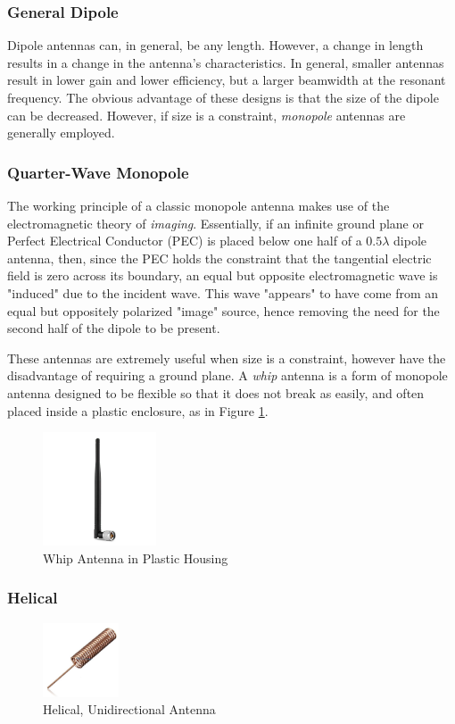 \subsubsection{General Dipole}
Dipole antennas can, in general, be any length. However, a change in length results in a change in the antenna's characteristics. In general, smaller antennas result in lower gain and lower efficiency, but a larger beamwidth at the resonant frequency. The obvious advantage of these designs is that the size of the dipole can be decreased. However, if size is a constraint, \textit{monopole} antennas are generally employed.

\subsubsection{Quarter-Wave Monopole}\label{monopole}
The working principle of a classic monopole antenna makes use of the electromagnetic theory of \textit{imaging}. Essentially, if an infinite ground plane or Perfect Electrical Conductor (PEC) is placed below one half of a $0.5 \lambda$ dipole antenna, then, since the PEC holds the constraint that the tangential electric field is zero across its boundary, an equal but opposite electromagnetic wave is "induced" due to the incident wave. This wave "appears" to have come from an equal but oppositely polarized "image" source, hence removing the need for the second half of the dipole to be present.

These antennas are extremely useful when size is a constraint, however have the disadvantage of requiring a ground plane. A \textit{whip} antenna is a form of monopole antenna designed to be flexible so that it does not break as easily, and often placed inside a plastic enclosure, as in Figure \ref{fig:whip}. \cite{site-antennaTheory}

\begin{figure}[!htb]
  \centering
  \includegraphics[width=0.3\textwidth]{whip}
  \caption{Whip Antenna in Plastic Housing}
  \label{fig:whip}
\end{figure}

\subsubsection{Helical}
\begin{figure}[!htb]
  \centering
  \includegraphics[width=0.2\textwidth]{helical_uni}
  \caption{Helical, Unidirectional Antenna}
  \label{fig:helical_uni}
\end{figure}

